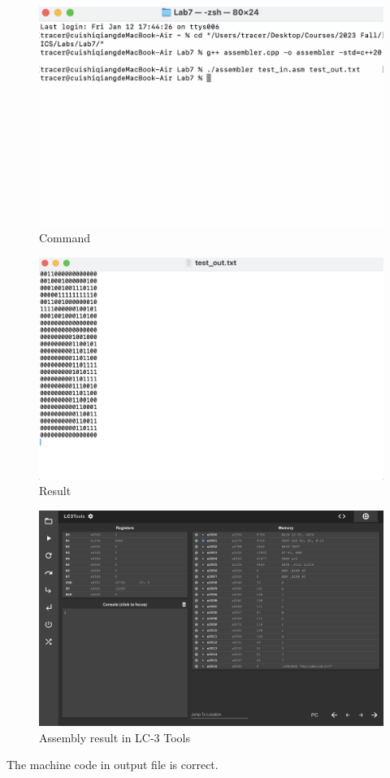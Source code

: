 \documentclass[UTF8]{ctexart}
\begin{document}
\begin{figure}[H]
  \centering
  \includegraphics[scale=0.4]{command.png}
  \caption{Command}
\end{figure}

\begin{figure}[H]
  \centering
  \includegraphics[scale=0.4]{result.png}
  \caption{Result}
\end{figure}

\begin{figure}[H]
  \centering
  \includegraphics[scale=0.25]{lc3.png}
  \caption{Assembly result in LC-3 Tools}
\end{figure}

The machine code in output file is correct.


\end{document}
